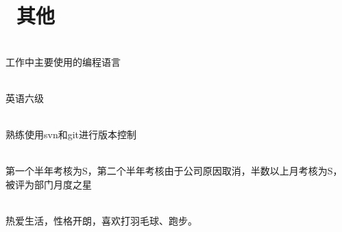 \documentclass{resume}
\begin{document}
\newpage

\section{\faInfo\ 其他}
\begin{description}[parsep=1em]
  \item[C语言]\hfill\\
    工作中主要使用的编程语言
  
  \item[英语]\hfill\\
    英语六级
  
  \item[代码管理]\hfill\\
    熟练使用svn和git进行版本控制
  
  \item[个人考核]\hfill\\
  第一个半年考核为S，第二个半年考核由于公司原因取消，半数以上月考核为S，\\ 被评为部门月度之星
    
  \item[兴趣爱好]\hfill\\
    热爱生活，性格开朗，喜欢打羽毛球、跑步。
\end{description}
\end{document}
